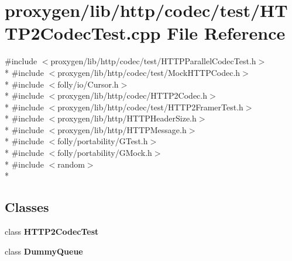 \section{proxygen/lib/http/codec/test/\+H\+T\+T\+P2\+Codec\+Test.cpp File Reference}
\label{HTTP2CodecTest_8cpp}
{\ttfamily \#include $<$proxygen/lib/http/codec/test/\+H\+T\+T\+P\+Parallel\+Codec\+Test.\+h$>$}\\*
{\ttfamily \#include $<$proxygen/lib/http/codec/test/\+Mock\+H\+T\+T\+P\+Codec.\+h$>$}\\*
{\ttfamily \#include $<$folly/io/\+Cursor.\+h$>$}\\*
{\ttfamily \#include $<$proxygen/lib/http/codec/\+H\+T\+T\+P2\+Codec.\+h$>$}\\*
{\ttfamily \#include $<$proxygen/lib/http/codec/test/\+H\+T\+T\+P2\+Framer\+Test.\+h$>$}\\*
{\ttfamily \#include $<$proxygen/lib/http/\+H\+T\+T\+P\+Header\+Size.\+h$>$}\\*
{\ttfamily \#include $<$proxygen/lib/http/\+H\+T\+T\+P\+Message.\+h$>$}\\*
{\ttfamily \#include $<$folly/portability/\+G\+Test.\+h$>$}\\*
{\ttfamily \#include $<$folly/portability/\+G\+Mock.\+h$>$}\\*
{\ttfamily \#include $<$random$>$}\\*
\subsection*{Classes}
\begin{DoxyCompactItemize}
\item 
class {\bf H\+T\+T\+P2\+Codec\+Test}
\item 
class {\bf Dummy\+Queue}
\end{DoxyCompactItemize}
